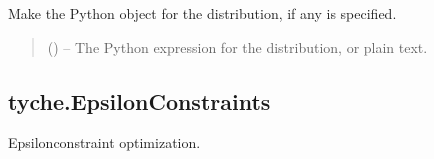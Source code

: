 \documentclass[letterpaper,10pt,english]{sphinxmanual}
\begin{document}
\begin{fulllineitems}
\label{\detokenize{tyche:tyche.Distributions.parse_distribution}}
\pysigstartsignatures
{}
\pysigstopsignatures
\sphinxAtStartPar
Make the Python object for the distribution, if any is specified.
\begin{quote}\begin{description}
\sphinxAtStartPar
{} () – The Python expression for the distribution, or plain text.

\end{description}\end{quote}

\end{fulllineitems}



\subsection{tyche.EpsilonConstraints}
\label{\detokenize{tyche:module-tyche.EpsilonConstraints}}\label{\detokenize{tyche:tyche-epsilonconstraints}}\label{\detokenize{tyche:sec-epsconstraint}}
\sphinxAtStartPar
Epsilon\sphinxhyphen{}constraint optimization.
\end{document}
